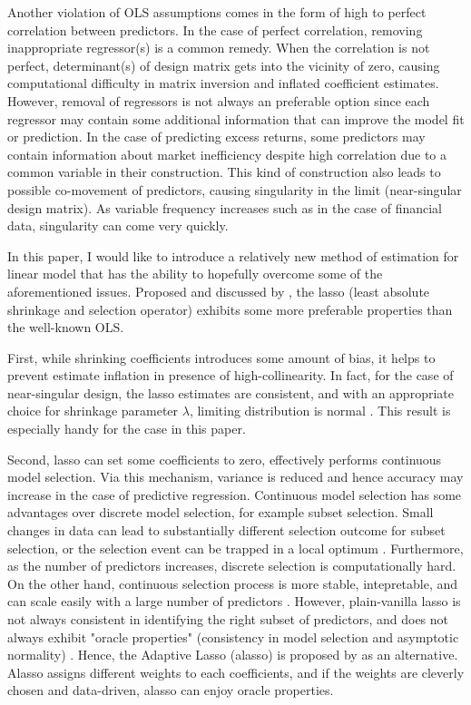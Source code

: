\documentclass[12pt,a4paper]{article}
\begin{document}
Another violation of OLS assumptions comes in the form of high to perfect correlation between predictors. In the case of perfect correlation, removing inappropriate regressor(s) is a common remedy. When the correlation is not perfect, determinant(s) of design matrix gets into the vicinity of zero, causing computational difficulty in matrix inversion and inflated coefficient estimates. However, removal of regressors is not always an preferable option since each regressor may contain some additional information that can improve the model fit or prediction. In the case of predicting excess returns, some predictors may contain information about market inefficiency despite high correlation due to a common variable in their construction. This kind of construction also leads to possible co-movement of predictors, causing singularity in the limit (near-singular design matrix). As variable frequency increases such as in the case of financial data, singularity can come very quickly.

In this paper, I would like to introduce a relatively new method of estimation for linear model that has the ability to hopefully overcome some of the aforementioned issues. Proposed and discussed by \cite{tibshirani1996regression}, the lasso (least absolute shrinkage and selection operator) exhibits some more preferable properties than the well-known OLS.

First, while shrinking coefficients introduces some amount of bias, it helps to prevent estimate inflation in presence of high-collinearity. In fact, for the case of near-singular design, the lasso estimates are consistent, and with an appropriate choice for shrinkage parameter $ \lambda $, limiting distribution is normal \citep{knight2000asymptotics, knight2008shrinkage}. This result is especially handy for the case in this paper.

Second, lasso can set some coefficients to zero, effectively performs continuous model selection. Via this mechanism, variance is reduced and hence accuracy may increase in the case of predictive regression. Continuous model selection has some advantages over discrete model selection, for example subset selection. Small changes in data can lead to substantially different selection outcome for subset selection, or the selection event can be trapped in a local optimum \citep{breiman1995better}. Furthermore, as the number of predictors increases, discrete selection is computationally hard. On the other hand, continuous selection process is more stable, intepretable, and can scale easily with a large number of predictors \citep{tibshirani1996regression}. However, plain-vanilla lasso is not always consistent in identifying the right subset of predictors, and does not always exhibit "oracle properties" (consistency in model selection and asymptotic normality) \citep{meinshausen2004consistent, zou2006adaptive}. Hence, the Adaptive Lasso (alasso) is proposed by \cite{zou2006adaptive} as an alternative. Alasso assigns different weights to each coefficients, and if the weights are cleverly chosen and data-driven, alasso can enjoy oracle properties. 
\end{document}
